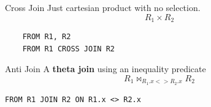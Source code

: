 \begin{tcbraster}[raster columns=2, raster equal height]
    \begin{definitionbox}{Cross Join}
        Just cartesian product with no selection.
        \[R_1 \times R_2\]
        \begin{verbatim}
    FROM R1, R2
    FROM R1 CROSS JOIN R2
        \end{verbatim}
    \end{definitionbox}
    \begin{definitionbox}{Anti Join}
        A \textbf{theta join} using an inequality predicate
        \[R_1 \bowtie_{R_1.x <> R_2.x} R_2\]
        \begin{verbatim}
FROM R1 JOIN R2 ON R1.x <> R2.x
        \end{verbatim}
    \end{definitionbox}
\end{tcbraster}

